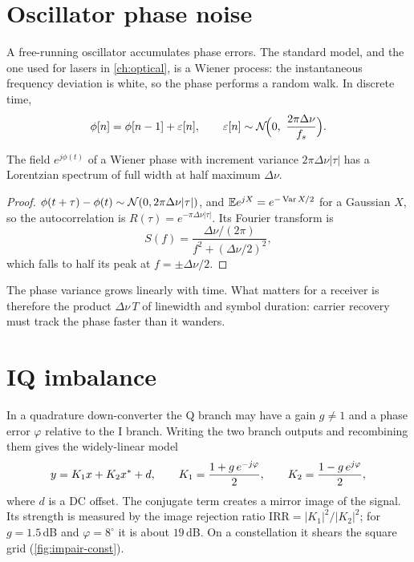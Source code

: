\section{Oscillator phase noise}\label{sec:phase-noise}
A free-running oscillator accumulates phase errors. The standard model, and the one used for
lasers in \cref{ch:optical}, is a Wiener process: the instantaneous frequency deviation is
white, so the phase performs a random walk. In discrete time,
\begin{equation}
  \phi[n]=\phi[n-1]+\varepsilon[n],\qquad \varepsilon[n]\sim\mathcal{N}\!\Big(0,\ \frac{2\pi\Delta\nu}{f_s}\Big).
  \label{eq:wiener}
\end{equation}
\begin{proposition}
The field $e^{j\phi(t)}$ of a Wiener phase with increment variance $2\pi\Delta\nu|\tau|$ has a
Lorentzian spectrum of full width at half maximum $\Delta\nu$.
\end{proposition}
\begin{proof}
$\phi(t+\tau)-\phi(t)\sim\mathcal{N}(0,2\pi\Delta\nu|\tau|)$, and $\mathbb{E} e^{jX}=e^{-\operatorname{Var} X/2}$ for a Gaussian
$X$, so the autocorrelation is $R(\tau)=e^{-\pi\Delta\nu|\tau|}$. Its Fourier transform is
\[
  S(f)=\frac{\Delta\nu/(2\pi)}{f^2+(\Delta\nu/2)^2},
\]
which falls to half its peak at $f=\pm\Delta\nu/2$.
\end{proof}
The phase variance grows linearly with time. What matters for a receiver is therefore the
product $\Delta\nu\,T$ of linewidth and symbol duration: carrier recovery must track the phase
faster than it wanders.

\section{IQ imbalance}
In a quadrature down-converter the Q branch may have a gain $g\ne1$ and a phase error $\varphi$
relative to the I branch. Writing the two branch outputs and recombining them gives the
widely-linear model
\begin{equation}
  y=K_1x+K_2x^{*}+d,\qquad K_1=\frac{1+g\,e^{-j\varphi}}{2},\qquad K_2=\frac{1-g\,e^{j\varphi}}{2},
  \label{eq:iq}
\end{equation}
where $d$ is a DC offset. The conjugate term creates a mirror image of the signal. Its
strength is measured by the image rejection ratio $\mathrm{IRR}=|K_1|^2/|K_2|^2$; for $g=1.5$\,dB
and $\varphi=8^\circ$ it is about $19$\,dB. On a constellation it shears the square grid
(\cref{fig:impair-const}).

